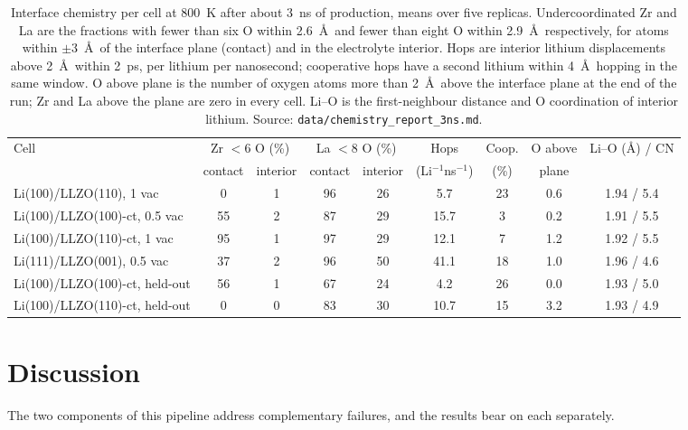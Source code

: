 \documentclass[11pt]{article}
\begin{document}
\begin{table}[htbp]
\centering
\caption{Interface chemistry per cell at 800~K after about 3~ns of
production, means over five replicas. Undercoordinated Zr
and La are the fractions with fewer than six O within 2.6~\AA\ and fewer than
eight O within 2.9~\AA\ respectively, for atoms within $\pm3$~\AA\ of the
interface plane (contact) and in the electrolyte interior. Hops are interior
lithium displacements above 2~\AA\ within 2~ps, per lithium per nanosecond;
cooperative hops have a second lithium within 4~\AA\ hopping in the same
window. O above plane is the number of oxygen atoms more than 2~\AA\ above the
interface plane at the end of the run; Zr and La above the plane are zero in
every cell. Li--O is the first-neighbour distance and O coordination of
interior lithium. Source: \texttt{data/chemistry\_report\_3ns.md}.}
\label{tab:chemistry}
\small
\begin{tabular}{lcccccccc}
\toprule
Cell & \multicolumn{2}{c}{Zr $<6$ O (\%)} & \multicolumn{2}{c}{La $<8$ O (\%)} & Hops & Coop. & O above & Li--O (\AA) / CN \\
 & contact & interior & contact & interior & (Li$^{-1}$ns$^{-1}$) & (\%) & plane & \\
\midrule
Li(100)/LLZO(110), 1 vac            & 0  & 1 & 96 & 26 & 5.7  & 23 & 0.6 & 1.94 / 5.4 \\
Li(100)/LLZO(100)-ct, 0.5 vac       & 55 & 2 & 87 & 29 & 15.7 & 3  & 0.2 & 1.91 / 5.5 \\
Li(100)/LLZO(110)-ct, 1 vac         & 95 & 1 & 97 & 29 & 12.1 & 7  & 1.2 & 1.92 / 5.5 \\
Li(111)/LLZO(001), 0.5 vac          & 37 & 2 & 96 & 50 & 41.1 & 18 & 1.0 & 1.96 / 4.6 \\
Li(100)/LLZO(100)-ct, held-out      & 56 & 1 & 67 & 24 & 4.2  & 26 & 0.0 & 1.93 / 5.0 \\
Li(100)/LLZO(110)-ct, held-out      & 0  & 0 & 83 & 30 & 10.7 & 15 & 3.2 & 1.93 / 4.9 \\
\bottomrule
\end{tabular}
\end{table}

\section{Discussion}

The two components of this pipeline address complementary failures, and the
results bear on each separately.
\end{document}
